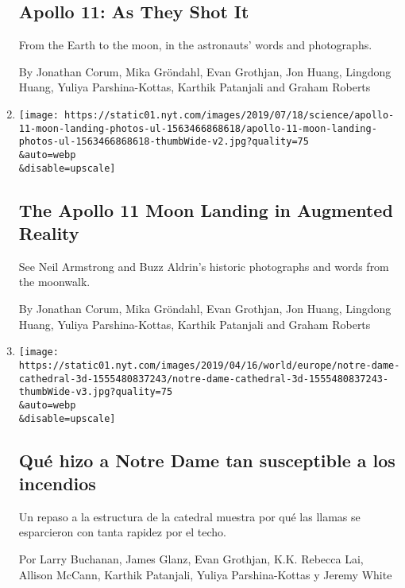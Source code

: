 \begin{enumerate}
  \hypertarget{apollo-11-as-they-shot-it}{%
  \subsection{Apollo 11: As They Shot
  It}\label{apollo-11-as-they-shot-it}}

  From the Earth to the moon, in the astronauts' words and photographs.

  By Jonathan Corum, Mika Gröndahl, Evan Grothjan, Jon Huang, Lingdong
  Huang, Yuliya Parshina-Kottas, Karthik Patanjali and Graham Roberts
\item
  \href{/interactive/2019/07/18/science/apollo-11-moon-landing-photos-ul.html}{}

  \texttt{[image: https://static01.nyt.com/images/2019/07/18/science/apollo-11-moon-landing-photos-ul-1563466868618/apollo-11-moon-landing-photos-ul-1563466868618-thumbWide-v2.jpg?quality=75\\\&auto=webp\\\&disable=upscale]}

  \hypertarget{the-apollo-11-moon-landing-in-augmented-reality}{%
  \subsection{The Apollo 11 Moon Landing in Augmented
  Reality}\label{the-apollo-11-moon-landing-in-augmented-reality}}

  See Neil Armstrong and Buzz Aldrin's historic photographs and words
  from the moonwalk.

  By Jonathan Corum, Mika Gröndahl, Evan Grothjan, Jon Huang, Lingdong
  Huang, Yuliya Parshina-Kottas, Karthik Patanjali and Graham Roberts
\item
  \href{/es/interactive/2019/04/17/universal/catedral-atico.html}{}

  \texttt{[image: https://static01.nyt.com/images/2019/04/16/world/europe/notre-dame-cathedral-3d-1555480837243/notre-dame-cathedral-3d-1555480837243-thumbWide-v3.jpg?quality=75\\\&auto=webp\\\&disable=upscale]}

  \hypertarget{quuxe9-hizo-a-notre-dame-tan-susceptible-a-los-incendios}{%
  \subsection{Qué hizo a Notre Dame tan susceptible a los
  incendios}\label{quuxe9-hizo-a-notre-dame-tan-susceptible-a-los-incendios}}

  Un repaso a la estructura de la catedral muestra por qué las llamas se
  esparcieron con tanta rapidez por el techo.

  Por Larry Buchanan, James Glanz, Evan Grothjan, K.K. Rebecca Lai,
  Allison McCann, Karthik Patanjali, Yuliya Parshina-Kottas y Jeremy
  White
\end{enumerate}

